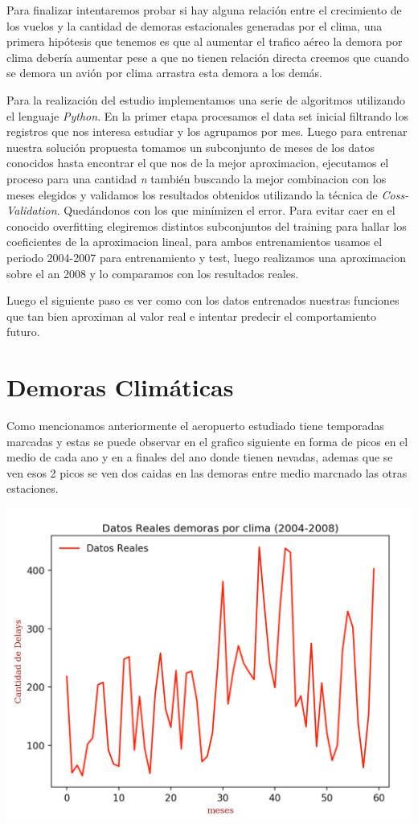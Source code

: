 \documentclass{endm}
\begin{document}
Para finalizar intentaremos probar si hay alguna relaci\'on entre el crecimiento de los vuelos y la cantidad de demoras estacionales generadas por el clima, una primera hip\'otesis que tenemos es que al aumentar el trafico aéreo la demora por clima deber\'ia aumentar pese a que no tienen relaci\'on directa creemos que cuando se demora un avi\'on por clima arrastra esta demora a los dem\'as.

Para la realizaci\'on del estudio implementamos una serie de algoritmos utilizando el lenguaje \textit{Python}. En la primer etapa procesamos el data set inicial filtrando los registros que nos interesa estudiar y los agrupamos por mes. Luego para entrenar nuestra soluci\'on propuesta tomamos un subconjunto de meses de los datos conocidos hasta encontrar el que nos de la mejor aproximacion, ejecutamos el proceso para una cantidad \textit{n} tambi\'en buscando la mejor combinacion con los meses elegidos y validamos los resultados obtenidos utilizando la t\'ecnica de \textit{Coss-Validation}. Qued\'andonos con los que min\'imizen el error. Para evitar caer en el conocido overfitting elegiremos distintos subconjuntos del training para hallar los coeficientes de la aproximacion lineal, para ambos entrenamientos usamos el periodo 2004-2007 para entrenamiento y test,  luego realizamos una aproximacion sobre el a\˜n 2008 y lo comparamos con los resultados reales.

Luego el siguiente paso es ver como con los datos entrenados nuestras funciones que tan bien aproximan al valor real e intentar predecir el comportamiento futuro.


\section{Demoras Clim\'aticas}

Como mencionamos anteriormente el aeropuerto estudiado tiene temporadas marcadas y estas se puede observar en el grafico siguiente en forma de picos en el medio de cada a\˜no y en a finales del a\˜no donde tienen nevadas, ademas que se ven esos 2 picos se ven dos caidas en las demoras entre medio marcnado las otras estaciones.

\begin{center}
\includegraphics[scale=0.5]{imagenes/reales.png}
\end{center}
\end{document}

